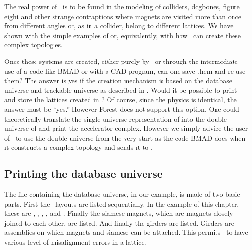 {The real power of \PTC\ is to be found in the modeling of colliders, dogbones, figure eight and other strange contraptions where magnets are visited more than once from different angles or, as in a collider, belong to different lattices.  We have shown with the simple examples of   or, equivalently, with  how \PTC\ can create these complex topologies. 

Once these systems are created, either purely by \PTC\, or through the intermediate use of a code like BMAD or with a CAD program, can one save them and re-use them? The answer is yes if the creation mechanism is based on the database universe  and trackable universe  as described in  . Would it be possible to print and store the lattices created in ? Of course, since the physics is identical, the answer must be ``yes.'' However Forest does not support this option. One could theoretically translate the single universe representation of  into the double universe of  and print the accelerator complex. However we simply advice the user of \PTC\
to use the double universe from the very start as the code BMAD does when it  constructs a complex topology and sends it to \PTC .

\subsection{Printing the database universe}

The file containing the database universe,  in our example, is made of two basic parts. First the \DNA\ layouts are listed sequentially. In the example of this chapter, these are , , , ,  and . Finally the siamese magnets, which are magnets closely joined to each other, are listed. And finally the girders are listed. Girders are assemblies on which magnets and siamese can be attached. This permits \PTC\ to have various level of misalignment errors in a lattice. 

}
